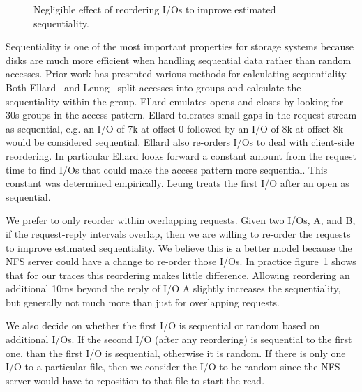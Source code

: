 \begin{figure*}
\caption{number of reads in a single group (more than 30s gap between I/Os); }
\label{fig:seq-analysis}
\end{figure*}

\begin{figure}
\caption{Negligible effect of reordering I/Os to improve estimated sequentiality.}
\label{fig:seq-bytes-compare}
\end{figure}

Sequentiality is one of the most important properties for storage
systems because disks are much more efficient when handling sequential
data rather than random accesses.  Prior work has presented
various methods for calculating sequentiality.  Both
Ellard~\cite{EllardFast03} and Leung~\cite{LeungUsenix08} split accesses
into groups and calculate the sequentiality within the group.  Ellard
emulates opens and closes by looking for 30s groups in the access
pattern.  Ellard tolerates small gaps in the request stream as
sequential, e.g. an I/O of 7k at offset 0 followed by an I/O of 8k at
offset 8k would be considered sequential.  Ellard also re-orders I/Os
to deal with client-side reordering. In particular Ellard looks
forward a constant amount from the request time to find I/Os that
could make the access pattern more sequential.  This constant was
determined empirically.  Leung treats the first I/O after an open as
sequential.

We prefer to only reorder within overlapping requests. Given two I/Os,
A, and B, if the request-reply intervals overlap, then we are willing
to re-order the requests to improve estimated sequentiality.  We
believe this is a better model because the NFS server could have a
change to re-order those I/Os.  In practice
figure~\ref{fig:seq-bytes-compare} shows that for our traces this
reordering makes little difference.  Allowing reordering an additional
10ms beyond the reply of I/O A slightly increases the sequentiality,
but generally not much more than just for overlapping requests.

We also decide on whether the first I/O is sequential or random based
on additional I/Os.  If the second I/O (after any reordering) is
sequential to the first one, than the first I/O is sequential,
otherwise it is random.  If there is only one I/O to a particular
file, then we consider the I/O to be random since the NFS server would
have to reposition to that file to start the read.  

